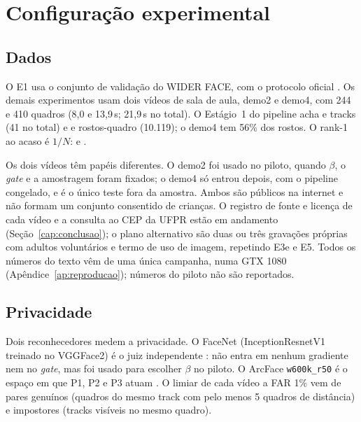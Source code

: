 \chapter{Configuração experimental}
\label{cap:experimentos}


\section{Dados}

O E1 usa o conjunto de validação do WIDER FACE, com o protocolo oficial \citep{widerface}. Os demais experimentos usam dois vídeos de sala de aula, demo2 e demo4, com 244 e 410 quadros (8,0 e 13,9\,s; 21,9\,s no total). O Estágio~1 do pipeline acha  e  tracks (41 no total) e  e  rostos-quadro (10.119); o demo4 tem 56\% dos rostos. O rank-1 ao acaso é $1/N$:  e .

Os dois vídeos têm papéis diferentes. O demo2 foi usado no piloto, quando $\beta$, o \emph{gate} e a amostragem foram fixados; o demo4 só entrou depois, com o pipeline congelado, e é o único teste fora da amostra. Ambos são públicos na internet e não formam um conjunto consentido de crianças. O registro de fonte e licença de cada vídeo e a consulta ao CEP da UFPR estão em andamento (Seção~\ref{cap:conclusao}); o plano alternativo são duas ou três gravações próprias com adultos voluntários e termo de uso de imagem, repetindo E3e e E5. Todos os números do texto vêm de uma única campanha, numa GTX 1080 (Apêndice~\ref{ap:reproducao}); números do piloto não são reportados.

\section{Privacidade}

Dois reconhecedores medem a privacidade. O FaceNet (InceptionResnetV1 treinado no VGGFace2) é o juiz independente \citep{facenet,vggface2}: não entra em nenhum gradiente nem no \emph{gate}, mas foi usado para escolher $\beta$ no piloto. O ArcFace \texttt{w600k\_r50} é o espaço em que P1, P2 e P3 atuam \citep{arcface}. O limiar de cada vídeo a FAR 1\% vem de pares genuínos (quadros do mesmo track com pelo menos 5 quadros de distância) e impostores (tracks visíveis no mesmo quadro).

